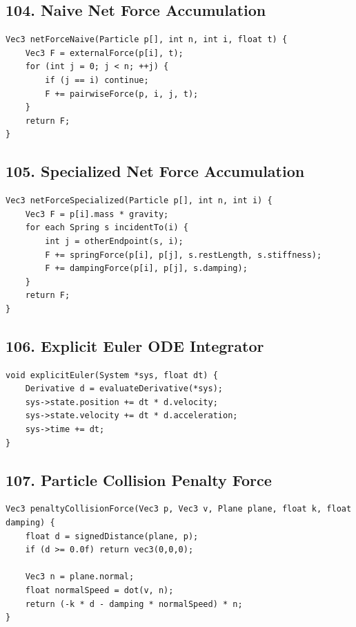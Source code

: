 \documentclass[10pt,letterpaper]{article}
\begin{document}
\subsection{104. Naive Net Force Accumulation}

\begin{verbatim}
Vec3 netForceNaive(Particle p[], int n, int i, float t) {
    Vec3 F = externalForce(p[i], t);
    for (int j = 0; j < n; ++j) {
        if (j == i) continue;
        F += pairwiseForce(p, i, j, t);
    }
    return F;
}
\end{verbatim}

\subsection{105. Specialized Net Force Accumulation}

\begin{verbatim}
Vec3 netForceSpecialized(Particle p[], int n, int i) {
    Vec3 F = p[i].mass * gravity;
    for each Spring s incidentTo(i) {
        int j = otherEndpoint(s, i);
        F += springForce(p[i], p[j], s.restLength, s.stiffness);
        F += dampingForce(p[i], p[j], s.damping);
    }
    return F;
}
\end{verbatim}

\subsection{106. Explicit Euler ODE Integrator}

\begin{verbatim}
void explicitEuler(System *sys, float dt) {
    Derivative d = evaluateDerivative(*sys);
    sys->state.position += dt * d.velocity;
    sys->state.velocity += dt * d.acceleration;
    sys->time += dt;
}
\end{verbatim}

\subsection{107. Particle Collision Penalty Force}

\begin{verbatim}
Vec3 penaltyCollisionForce(Vec3 p, Vec3 v, Plane plane, float k, float damping) {
    float d = signedDistance(plane, p);
    if (d >= 0.0f) return vec3(0,0,0);

    Vec3 n = plane.normal;
    float normalSpeed = dot(v, n);
    return (-k * d - damping * normalSpeed) * n;
}
\end{verbatim}
\end{document}
